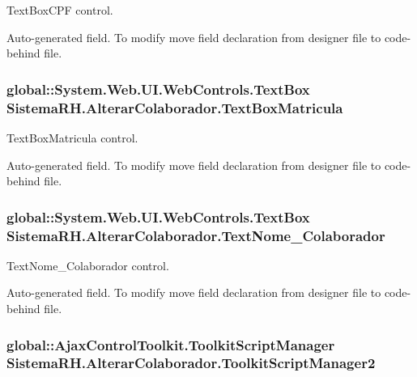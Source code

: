 TextBoxCPF control. 

Auto-\/generated field. To modify move field declaration from designer file to code-\/behind file. \hypertarget{class_sistema_r_h_1_1_alterar_colaborador_ae09d7263d5a691e53d10ef3031330fa1}{
\subsubsection[{TextBoxMatricula}]{\setlength{\rightskip}{0pt plus 5cm}global::System.Web.UI.WebControls.TextBox {\bf SistemaRH.AlterarColaborador.TextBoxMatricula}}}
\label{class_sistema_r_h_1_1_alterar_colaborador_ae09d7263d5a691e53d10ef3031330fa1}


TextBoxMatricula control. 

Auto-\/generated field. To modify move field declaration from designer file to code-\/behind file. \hypertarget{class_sistema_r_h_1_1_alterar_colaborador_ac2661901be83a1a4b14672993e91b0c1}{
\subsubsection[{TextNome\_\-Colaborador}]{\setlength{\rightskip}{0pt plus 5cm}global::System.Web.UI.WebControls.TextBox {\bf SistemaRH.AlterarColaborador.TextNome\_\-Colaborador}}}
\label{class_sistema_r_h_1_1_alterar_colaborador_ac2661901be83a1a4b14672993e91b0c1}


TextNome\_\-Colaborador control. 

Auto-\/generated field. To modify move field declaration from designer file to code-\/behind file. \hypertarget{class_sistema_r_h_1_1_alterar_colaborador_acbab47800fff56abc05ce1b83a1c9473}{
\subsubsection[{ToolkitScriptManager2}]{\setlength{\rightskip}{0pt plus 5cm}global::AjaxControlToolkit.ToolkitScriptManager {\bf SistemaRH.AlterarColaborador.ToolkitScriptManager2}}}
\label{class_sistema_r_h_1_1_alterar_colaborador_acbab47800fff56abc05ce1b83a1c9473}


